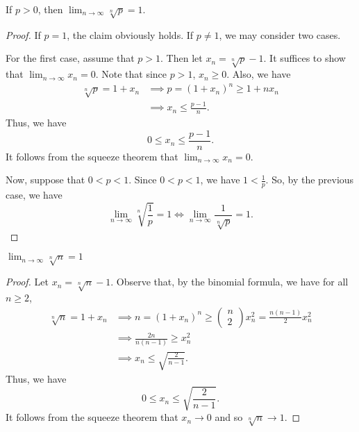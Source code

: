 \documentclass[a4paper]{article}
\begin{document}
\begin{theorem}[(b)]
    If \( p > 0  \), then \( \lim_{ n \to \infty  } \sqrt[n]{ p } = 1    \).
\end{theorem}
\begin{proof}
If \( p = 1  \), the claim obviously holds. If \( p \neq 1  \), we may consider two cases.

For the first case, assume that \( p > 1 \). Then let \( {x}_{n} = \sqrt[n]{ p }  - 1  \). It suffices to show that \( \lim_{ n \to \infty  }  {x}_{n}  = 0 \). Note that since \( p > 1  \), \( {x}_{n} \geq 0  \). Also, we have
\begin{align*}
    \sqrt[n]{ p }  = 1 + {x}_{n} &\implies p = (1 + {x}_{n})^{n} \geq 1 + n {x}_{n}  \\
                                 &\implies {x}_{n} \leq \frac{ p - 1  }{ n }.
\end{align*}
Thus, we have 
\[  0 \leq {x}_{n} \leq \frac{ p - 1  }{ n }. \]
It follows from the squeeze theorem that \( \lim_{ n \to \infty  }  {x}_{n} = 0  \).

Now, suppose that \( 0  < p < 1  \). Since \( 0 < p < 1  \), we have \( 1 < \frac{ 1 }{ p }  \). So, by the previous case, we have 
\[  \lim_{ n \to \infty  }  \sqrt[n]{ \frac{ 1 }{p}  } = 1 \iff \lim_{ n \to \infty  }  \frac{ 1  }{  \sqrt[n]{ p }  }  = 1.    \]
\end{proof}

\begin{theorem}[(c)]
    \( \lim_{ n \to \infty  } \sqrt[n]{n} = 1  \)
\end{theorem}

\begin{proof}
    Let \( {x}_{n} = \sqrt[n]{n} - 1  \). Observe that, by the binomial formula, we have for all \( n \geq 2  \), 
    \begin{align*}
        \sqrt[n]{n} =  1 + {x}_{n} &\implies n = (1 + {x}_{n})^{n} \geq \begin{pmatrix} n \\ 2  \end{pmatrix}  {x}_{n}^{2} = \frac{ n(n-1) }{ 2  }  {x}_{n}^{2} \\
                                   &\implies \frac{ 2n  }{ n (n-1) } \geq {x}_{n}^{2} \\
                                   &\implies {x}_{n} \leq \sqrt{ \frac{ 2  }{ n - 1 }  }. 
    \end{align*}
    Thus, we have 
    \[  0 \leq {x}_{n} \leq \sqrt{ \frac{ 2  }{ n - 1  }  }. \]
    It follows from the squeeze theorem that \( {x}_{n} \to 0  \) and so \( \sqrt[n]{n} \to 1  \).
\end{proof}
\end{document}
